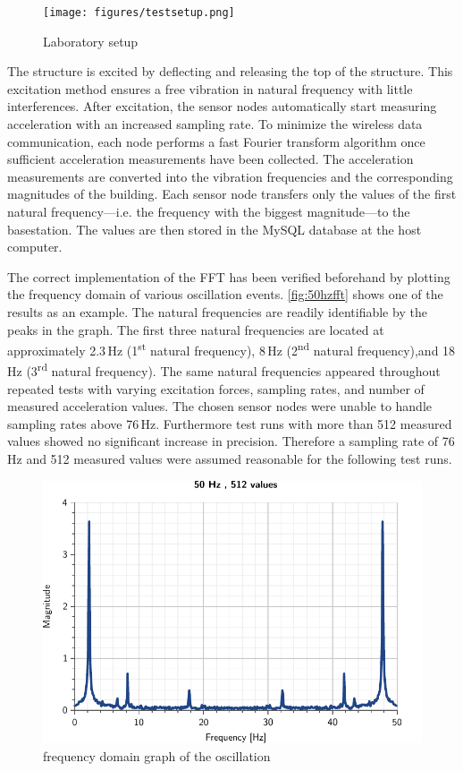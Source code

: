 \documentclass[12pt,a4paper]{scrartcl}
\begin{document}

\begin{figure}[ht]
    \centering
    \texttt{[image: figures/testsetup.png]}
    \caption{Laboratory setup}
    \label{fig:teststructure}
\end{figure}

The structure is excited by deflecting and releasing the top of the structure.
This excitation method ensures a free vibration in natural frequency with little interferences.
After excitation, the sensor nodes automatically start measuring acceleration with an increased sampling rate.
To minimize the wireless data communication, each node performs a fast Fourier transform algorithm once sufficient acceleration measurements have been collected.
The acceleration measurements are converted into the vibration frequencies and the corresponding magnitudes of the building.
Each sensor node transfers only the values of the first natural frequency---i.e. the frequency with the biggest magnitude---to the basestation. 
The values are then stored in the MySQL database at the host computer.

The correct implementation of the FFT has been verified beforehand by plotting the frequency domain of various oscillation events.
\autoref{fig:50hzfft} shows  one of the results as an example.
The natural frequencies are readily identifiable by the peaks in the graph.
The first three natural frequencies are located at approximately 2.3\,Hz (1\textsuperscript{st} natural frequency), 8\,Hz (2\textsuperscript{nd} natural frequency),and 18\,Hz (3\textsuperscript{rd} natural frequency).
The same natural frequencies appeared throughout repeated tests with varying excitation forces, sampling rates, and number of measured acceleration values.
The chosen sensor nodes were unable to handle sampling rates above 76\,Hz.
Furthermore test runs with more than 512 measured values showed no significant increase in precision.
Therefore a sampling rate of 76\,Hz and 512 measured values were assumed reasonable for the following test runs.

\begin{figure}[ht]
    \centering
    \includegraphics{figures/50Hz.pdf}
    \caption{frequency domain graph of the oscillation}
    \label{fig:50hzfft}
\end{figure}
\end{document}
